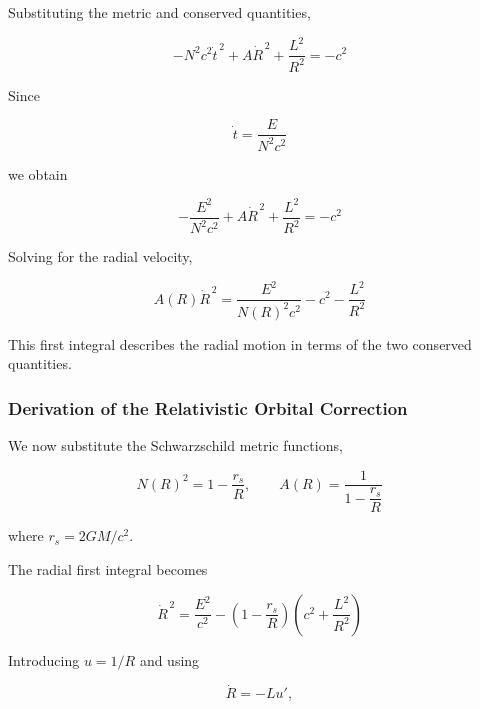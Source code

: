 \documentclass[pdflatex,sn-mathphys-num]{sn-jnl}%
\theoremstyle{thmstyleone}%
\theoremstyle{thmstyletwo}%
\theoremstyle{thmstylethree}%
\begin{document}
\begin{appendices}
Substituting the metric and conserved quantities,

\begin{equation}
    -N^2c^2\dot{t}^{\,2}
    +
    A\dot{R}^{\,2}
    +
    \frac{L^2}{R^2}
    =
    -c^2
\end{equation}

Since

\begin{equation}
    \dot{t}
    =
    \frac{E}{N^2c^2}
\end{equation}

we obtain

\begin{equation}
    -\frac{E^2}{N^2c^2}
    +
    A\dot{R}^{\,2}
    +
    \frac{L^2}{R^2}
    =
    -c^2
\end{equation}

Solving for the radial velocity,

\begin{equation}
    \boxed{
    A(R)\dot{R}^{\,2}
    =
    \frac{E^2}{N(R)^2c^2}
    -
    c^2
    -
    \frac{L^2}{R^2}
    }
\end{equation}

This first integral describes the radial motion in terms of the two conserved quantities.

\subsubsection{Derivation of the Relativistic Orbital Correction}

We now substitute the Schwarzschild metric functions,

\begin{equation}
    N(R)^2
    =
    1-\frac{r_s}{R},
    \qquad
    A(R)
    =
    \frac{1}{1-\dfrac{r_s}{R}}
\end{equation}

where $r_s=2GM/c^2$.

The radial first integral becomes

\begin{equation}
    \dot{R}^{\,2}
    =
    \frac{E^2}{c^2}
    -
    \left(1-\frac{r_s}{R}\right)
    \left(c^2+\frac{L^2}{R^2}\right)
\end{equation}

Introducing $u=1/R$ and using

\begin{equation}
    \dot{R}=-Lu',
\end{equation}


\end{appendices}
\end{document}
